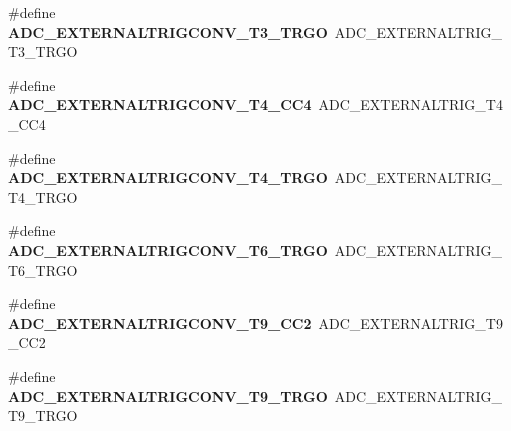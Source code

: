 \begin{DoxyCompactItemize}
\item 
\hypertarget{group___a_d_c___external__trigger__source___regular_ga41bef7b6bfdb6641a97e89aa4abc405e}{\#define {\bfseries A\-D\-C\-\_\-\-E\-X\-T\-E\-R\-N\-A\-L\-T\-R\-I\-G\-C\-O\-N\-V\-\_\-\-T3\-\_\-\-T\-R\-G\-O}~A\-D\-C\-\_\-\-E\-X\-T\-E\-R\-N\-A\-L\-T\-R\-I\-G\-\_\-\-T3\-\_\-\-T\-R\-G\-O}\label{group___a_d_c___external__trigger__source___regular_ga41bef7b6bfdb6641a97e89aa4abc405e}

\item 
\hypertarget{group___a_d_c___external__trigger__source___regular_gae0e57ccf3d178e6819ce32c0124e4f0f}{\#define {\bfseries A\-D\-C\-\_\-\-E\-X\-T\-E\-R\-N\-A\-L\-T\-R\-I\-G\-C\-O\-N\-V\-\_\-\-T4\-\_\-\-C\-C4}~A\-D\-C\-\_\-\-E\-X\-T\-E\-R\-N\-A\-L\-T\-R\-I\-G\-\_\-\-T4\-\_\-\-C\-C4}\label{group___a_d_c___external__trigger__source___regular_gae0e57ccf3d178e6819ce32c0124e4f0f}

\item 
\hypertarget{group___a_d_c___external__trigger__source___regular_gaec1f9d0b9040535e70ba9e26d07df768}{\#define {\bfseries A\-D\-C\-\_\-\-E\-X\-T\-E\-R\-N\-A\-L\-T\-R\-I\-G\-C\-O\-N\-V\-\_\-\-T4\-\_\-\-T\-R\-G\-O}~A\-D\-C\-\_\-\-E\-X\-T\-E\-R\-N\-A\-L\-T\-R\-I\-G\-\_\-\-T4\-\_\-\-T\-R\-G\-O}\label{group___a_d_c___external__trigger__source___regular_gaec1f9d0b9040535e70ba9e26d07df768}

\item 
\hypertarget{group___a_d_c___external__trigger__source___regular_gae0a4be77c45699e79a820768a3184886}{\#define {\bfseries A\-D\-C\-\_\-\-E\-X\-T\-E\-R\-N\-A\-L\-T\-R\-I\-G\-C\-O\-N\-V\-\_\-\-T6\-\_\-\-T\-R\-G\-O}~A\-D\-C\-\_\-\-E\-X\-T\-E\-R\-N\-A\-L\-T\-R\-I\-G\-\_\-\-T6\-\_\-\-T\-R\-G\-O}\label{group___a_d_c___external__trigger__source___regular_gae0a4be77c45699e79a820768a3184886}

\item 
\hypertarget{group___a_d_c___external__trigger__source___regular_ga20fd7256812a66e217a161a794f905ea}{\#define {\bfseries A\-D\-C\-\_\-\-E\-X\-T\-E\-R\-N\-A\-L\-T\-R\-I\-G\-C\-O\-N\-V\-\_\-\-T9\-\_\-\-C\-C2}~A\-D\-C\-\_\-\-E\-X\-T\-E\-R\-N\-A\-L\-T\-R\-I\-G\-\_\-\-T9\-\_\-\-C\-C2}\label{group___a_d_c___external__trigger__source___regular_ga20fd7256812a66e217a161a794f905ea}

\item 
\hypertarget{group___a_d_c___external__trigger__source___regular_ga896bfbbd52bbc0aef9e52f92376efa78}{\#define {\bfseries A\-D\-C\-\_\-\-E\-X\-T\-E\-R\-N\-A\-L\-T\-R\-I\-G\-C\-O\-N\-V\-\_\-\-T9\-\_\-\-T\-R\-G\-O}~A\-D\-C\-\_\-\-E\-X\-T\-E\-R\-N\-A\-L\-T\-R\-I\-G\-\_\-\-T9\-\_\-\-T\-R\-G\-O}\label{group___a_d_c___external__trigger__source___regular_ga896bfbbd52bbc0aef9e52f92376efa78}


\end{DoxyCompactItemize}
